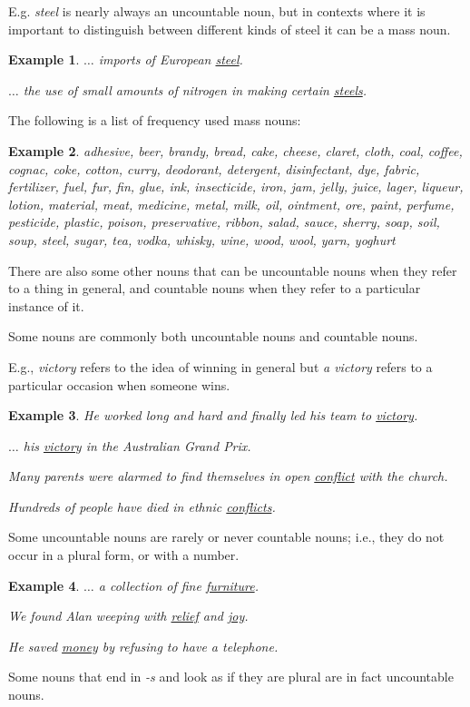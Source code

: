 \documentclass[oneside]{book}
\numberwithin{equation}{section}
\newtheorem{example}{Example}[section]
\begin{document}
E.g. \textit{steel} is nearly always an uncountable noun, but in contexts where it is important to distinguish between different kinds of steel it can be a mass noun.
\begin{example}
    $\ldots$ imports of European \underline{steel}.
    
    $\ldots$ the use of small amounts of nitrogen in making certain \underline{steels}.
\end{example}
%
\noindent{} The following is a list of frequency used mass nouns:
\begin{example}
    adhesive, beer, brandy, bread, cake, cheese, claret, cloth, coal, coffee, cognac, coke, cotton, curry, deodorant, detergent, disinfectant, dye, fabric, fertilizer, fuel, fur, fin, glue, ink, insecticide, iron, jam, jelly, juice, lager, liqueur, lotion, material, meat, medicine, metal, milk, oil, ointment, ore, paint, perfume, pesticide, plastic, poison, preservative, ribbon, salad, sauce, sherry, soap, soil, soup, steel, sugar, tea, vodka, whisky, wine, wood, wool, yarn, yoghurt
\end{example}
%
\noindent{} There are also some other nouns that can be uncountable nouns when they refer to a thing in general, and countable nouns when they refer to a particular instance of it.

%
Some nouns are commonly both uncountable nouns and countable nouns.

E.g., \textit{victory} refers to the idea of winning in general but \textit{a victory} refers to a particular occasion when someone wins.
\begin{example}
    He worked long and hard and finally led his team to \underline{victory}.
    
    $\ldots$ his \underline{victory} in the Australian Grand Prix.
    
    Many parents were alarmed to find themselves in open \underline{conflict} with the church.
    
    Hundreds of people have died in ethnic \underline{conflicts}.
\end{example}
Some uncountable nouns are rarely or never countable nouns; i.e., they do not occur in a plural form, or with a number.
\begin{example}
    $\ldots$ a collection of fine \underline{furniture}.
    
    We found Alan weeping with \underline{relief} and \underline{joy}.
    
    He saved \underline{money} by refusing to have a telephone.
\end{example}
%
\noindent{} Some nouns that end in \textit{-s} and look as if they are plural are in fact uncountable nouns.
\end{document}
